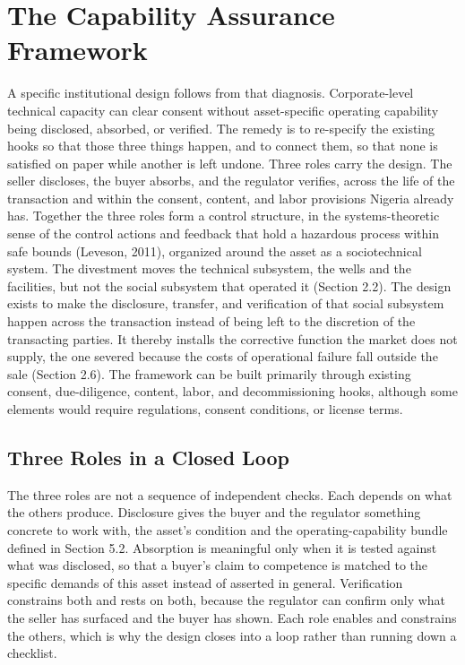 \documentclass[twoside,fontset=lmodern]{mitthesis}
\begin{document}
\hypertarget{the-capability-assurance-framework}{%
\section{The Capability Assurance
Framework}\label{the-capability-assurance-framework}}

A specific institutional design follows from that diagnosis.
Corporate-level technical capacity can clear consent without
asset-specific operating capability being disclosed, absorbed, or
verified. The remedy is to re-specify the existing hooks so that those
three things happen, and to connect them, so that none is satisfied on
paper while another is left undone. Three roles carry the design. The
seller discloses, the buyer absorbs, and the regulator verifies, across
the life of the transaction and within the consent, content, and labor
provisions Nigeria already has. Together the three roles form a control
structure, in the systems-theoretic sense of the control actions and
feedback that hold a hazardous process within safe bounds (Leveson,
2011), organized around the asset as a sociotechnical system. The
divestment moves the technical subsystem, the wells and the facilities,
but not the social subsystem that operated it (Section 2.2). The design
exists to make the disclosure, transfer, and verification of that social
subsystem happen across the transaction instead of being left to the
discretion of the transacting parties. It thereby installs the
corrective function the market does not supply, the one severed because
the costs of operational failure fall outside the sale (Section 2.6).
The framework can be built primarily through existing consent,
due-diligence, content, labor, and decommissioning hooks, although some
elements would require regulations, consent conditions, or license
terms.

\hypertarget{three-roles-in-a-closed-loop}{%
\subsection{Three Roles in a Closed
Loop}\label{three-roles-in-a-closed-loop}}

The three roles are not a sequence of independent checks. Each depends
on what the others produce. Disclosure gives the buyer and the regulator
something concrete to work with, the asset's condition and the
operating-capability bundle defined in Section 5.2. Absorption is
meaningful only when it is tested against what was disclosed, so that a
buyer's claim to competence is matched to the specific demands of this
asset instead of asserted in general. Verification constrains both and
rests on both, because the regulator can confirm only what the seller
has surfaced and the buyer has shown. Each role enables and constrains
the others, which is why the design closes into a loop rather than
running down a checklist.
\end{document}
